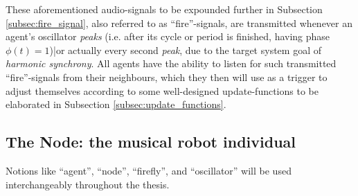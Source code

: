 	These aforementioned audio-signals to be expounded further in Subsection \ref{subsec:fire_signal}, also referred to as ``fire''-signals, are transmitted whenever an agent's oscillator \textit{peaks} (i.e. after its cycle or period is finished, having phase $\phi(t)=1$)|or actually every second \textit{peak}, due to the target system goal of \textit{harmonic synchrony}. All agents have the ability to listen for such transmitted ``fire''-signals from their neighbours, which they then will use as a trigger to adjust themselves according to some well-designed update-functions to be elaborated in Subsection \ref{subsec:update_functions}.




	
	\subsection{The Node: the musical robot individual}
	\label{subsec:node}
		
		Notions like ``agent'', ``node'', ``firefly'', and ``oscillator'' will be used interchangeably throughout the thesis.



